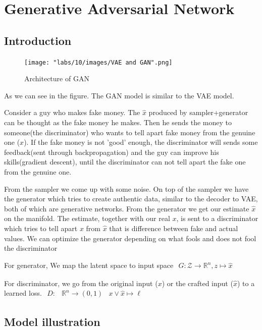 \section{Generative Adversarial Network}
\subsection{Introduction}
\begin{figure}
    \centering
    \texttt{[image: "labs/10/images/VAE and GAN".png]}
    \caption{Architecture of GAN}
    \label{fig:my_label}
\end{figure}

As we can see in the figure. The GAN model is similar to the VAE model.

Consider a guy who makes fake money. The $\hat{x}$ produced by sampler+generator can be thought as the fake money he makes. Then he sends the money to someone(the discriminator) who wants to tell apart fake money from the genuine one ($x$). If the fake money is not 'good' enough, the discriminator will sends some feedback(sent through backpropagation) and the guy can improve his skills(gradient descent), until the discriminator can not tell apart the fake one from the genuine one. 

From the sampler we come up with some noise. On top of the sampler we have the generator which tries to create authentic data, similar to the decoder to VAE, both of which are generative networks. From the generator we get our estimate $\hat{x}$on the manifold. The estimate, together with our real $x$, is sent to a discriminator which tries to tell apart $x$ from $\hat{x}$ that is difference between fake and actual values. We can optimize the generator depending on what fools and does not fool the discriminator

For generator, We map the latent space to input space $\begin{array}{r}{G : \mathcal{Z} \rightarrow \mathbb{R}^{n}}, {z \mapsto \hat{x}}\end{array}$

For discriminator, we go from the original input ($x$) or the crafted input ($\hat{x}$) to a learned loss. $\begin{aligned} D : & \mathbb{R}^{n} \rightarrow(0,1) & x \vee \hat{x} \mapsto \ell \end{aligned}$

\subsection{Model illustration}

